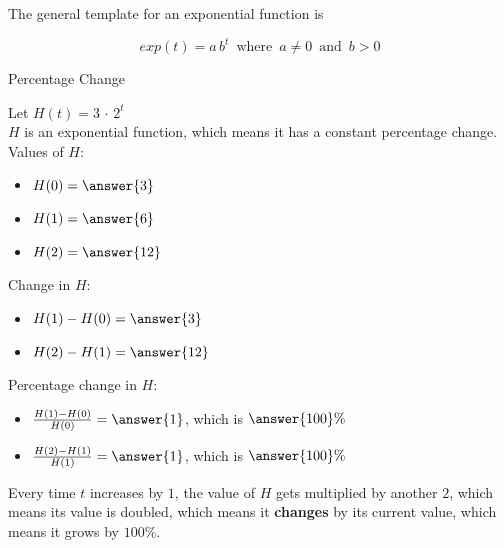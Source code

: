 \documentclass{ximera}
\begin{document}
The general template for an exponential function is 

\[   exp(t) = a \, b^t   \, \text{ where } \,  a \ne 0  \, \text{ and } \,    b > 0   \]



\begin{example} Percentage Change



Let $H(t) = 3 \, \cdot \, 2^t$ \\

$H$ is an exponential function, which means it has a constant percentage change. \\

Values of $H$:

\begin{itemize}
\item $H(0) = \answer{3}$

\item $H(1) = \answer{6}$

\item $H(2) = \answer{12}$
\end{itemize}



Change in $H$:

\begin{itemize}
\item $H(1) - H(0) = \answer{3}$

\item $H(2) - H(1) = \answer{12}$

\end{itemize}





Percentage change in $H$:

\begin{itemize}
\item $\frac{H(1) - H(0)}{H(0)} = \answer{1}$, which is $\answer{100}\%$

\item $\frac{H(2) - H(1)}{H(1)} = \answer{1}$, which is $\answer{100}\%$

\end{itemize}






\end{example}



Every time $t$ increases by $1$, the value of $H$ gets multiplied by another $2$, which means its value is doubled, which means it \textbf{changes} by its current value, which means it grows by $100\%$.
\end{document}
